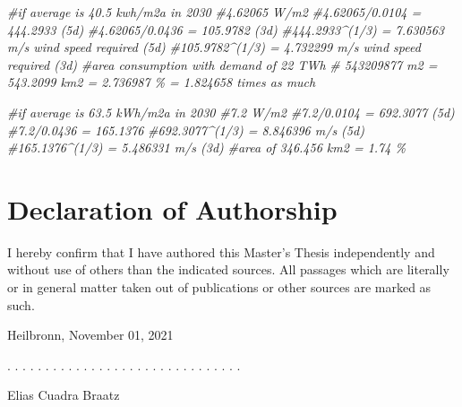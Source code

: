 \documentclass[a4paper,11pt]{article}
\newcommand{\thesistype}{Master's Thesis}
\newcommand{\thesisauthor}{Elias Cuadra Braatz}
\newcommand{\thesisdate}{November 01, 2021}
\newenvironment{Shaded}{\begin{snugshade}}{\end{snugshade}}
\newcommand{\CommentTok}[1]{\textcolor[rgb]{0.56,0.35,0.01}{\textit{#1}}}
\begin{document}
\begin{Shaded}
\begin{Highlighting}[]
\CommentTok{\#if average is 40.5 kwh/m2a in 2030}
\CommentTok{\#4.62065 W/m2}
\CommentTok{\#4.62065/0.0104 = 444.2933 (5d)}
\CommentTok{\#4.62065/0.0436 = 105.9782 (3d)}
\CommentTok{\#444.2933\^{}(1/3) = 7.630563 m/s wind speed required (5d)}
\CommentTok{\#105.9782\^{}(1/3) = 4.732299 m/s wind speed required (3d)}
\CommentTok{\#area consumption with demand of 22 TWh}
\CommentTok{\# 543209877 m2 = 543.2099 km2 = 2.736987 \% = 1.824658 times as much}

\CommentTok{\#if average is 63.5 kWh/m2a in 2030}
\CommentTok{\#7.2 W/m2}
\CommentTok{\#7.2/0.0104 = 692.3077 (5d)}
\CommentTok{\#7.2/0.0436 = 165.1376}
\CommentTok{\#692.3077\^{}(1/3) = 8.846396 m/s (5d)}
\CommentTok{\#165.1376\^{}(1/3) = 5.486331 m/s (3d)}
\CommentTok{\#area of 346.456 km2 = 1.74 \%}
\end{Highlighting}
\end{Shaded}





\newpage
\thispagestyle{empty}
\hypertarget{declaration-of-authorship}{%
\section*{Declaration of Authorship}\label{declaration-of-authorship}}

I hereby confirm that I have authored this \thesistype{} independently and
without use of others than the indicated sources. All passages which are
literally or in general matter taken out of publications or other sources are
marked as such.
\vspace{1cm}

Heilbronn, \thesisdate{}
\vspace{3cm}

. . . . . . . . . . . . . . . . . . . . . . . . . . . . . . .
\vspace{0.1cm}

\thesisauthor{}
\end{document}

